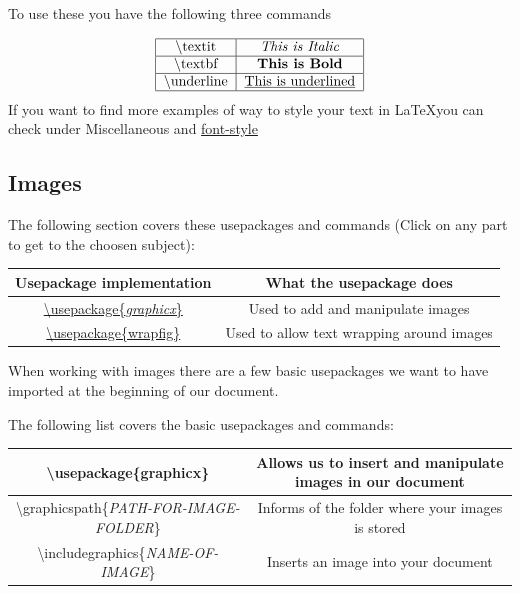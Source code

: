 \documentclass{article}
\newcommand{\bs}[1]{\textbackslash{}#1} %
\begin{document}
To use these you have the following three commands

\begin{align*}
    \begin{tabular}{|c|c|} \hline
       \bs{textit} & \textit{This is Italic} \\ \hline
       \bs{textbf} & \textbf{This is Bold} \\ \hline
       \bs{underline} & \underline{This is underlined} \\ \hline
    \end{tabular}
\end{align*}
If you want to find more examples of way to style your text in \LaTeX you can check under Miscellaneous and \hyperref[secc:font-style-sheet]{font-style}

\subsection{Images}
The following section covers these usepackages and commands (Click on any part to get to the choosen subject): \\

\vspace{1.5em}
\begin{table}[H]
    \noindent
    \centering
    \begin{tabular}{|c|c|} \hline
        \rowcolor{gray!30}
        Usepackage implementation & What the usepackage does \\ \hline
        \hyperref[tab:image_basic]{\bs{usepackage\{\textit{graphicx}\}}} & Used to add and manipulate images \\ \hline
        \hyperref[secc:image_wrapping]{\bs{usepackage\{wrapfig\}}} & Used to allow text wrapping around images \\ \hline 
    \end{tabular}
\end{table} %

When working with images there are a few basic usepackages we want to have imported at the beginning of our document.

The following list covers the basic usepackages and commands: \\
\begin{table}[H] \label{tab:image_basic}
    \centering
    \begin{tabular}{|c|c|} \hline
        \bs{usepackage\{graphicx\}} & Allows us to insert and manipulate images in our document \\ \hline 
        \bs{graphicspath\{\textit{PATH-FOR-IMAGE-FOLDER}\}} & Informs of the folder where your images is stored \\ \hline
        \bs{includegraphics\{\textit{NAME-OF-IMAGE}\}} & Inserts an image into your document \\ \hline
    \end{tabular}
\end{table} %
\end{document}
